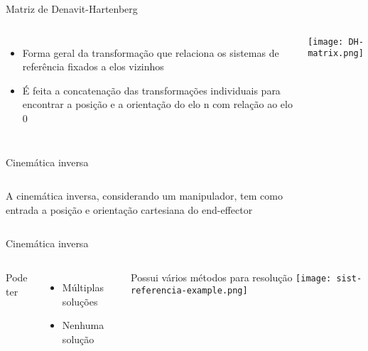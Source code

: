 \begin{frame}[c]{Matriz de Denavit-Hartenberg}
    \begin{columns}
        \begin{itemize}
            \item Forma geral da transformação que relaciona os sistemas de referência fixados a elos vizinhos
            \item É feita a concatenação das transformações individuais para
            encontrar a posição e a orientação do elo n com relação ao elo 0
        \end{itemize}
            \centering
            \texttt{[image: DH-matrix.png]}
    \end{columns}
\end{frame}
\begin{frame}[t]{Cinemática inversa} 
    
    \begin{columns}[c]
            A cinemática inversa, considerando um manipulador,
            tem como entrada a posição e orientação cartesiana do end-effector
            \begin{figure}
            \end{figure}
    \end{columns}
\end{frame}
\begin{frame}[c]{Cinemática inversa}
    \begin{columns}
        Pode ter
        \begin{itemize} 
            \item Múltiplas soluções
            \item Nenhuma solução
        \end{itemize}
        \singlespacing
            Possui vários métodos para resolução
            \centering
            \texttt{[image: sist-referencia-example.png]}
    \end{columns}
\end{frame}
